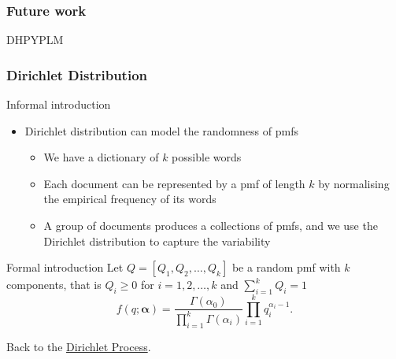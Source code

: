 \begin{frame}
    \frametitle{Future work}

    DHPYPLM
\end{frame}

\appendix
\begin{frame}[label=dirichletsupplemental]
    \frametitle{Dirichlet Distribution}

    \begin{block}{Informal introduction}
        \begin{itemize}
            \item Dirichlet distribution can model the randomness of pmfs
            \begin{itemize}
                \item We have a dictionary of $k$ possible words
                \item Each document can be represented by a pmf of length $k$ by normalising the empirical frequency of its words
                \item A group of documents produces a collections of pmfs, and we use the Dirichlet distribution to capture the variability
            \end{itemize}
        \end{itemize}
    \end{block}

    \begin{block}{Formal introduction}
        Let $Q = [Q_1, Q_2,\ldots,Q_k]$ be a random pmf with $k$ components, that is $Q_i \geq 0$ for $i=1,2,\ldots,k$ and $\sum_{i=1}^k Q_i = 1$
        \[ f(q;\boldsymbol\alpha) = \frac{\Gamma(\alpha_0)}{\prod_{i=1}^k\Gamma(\alpha_i)}\prod_{i=1}^kq_i^{\alpha_i-1}. \]
    \end{block}
Back to the \hyperlink{dirichletprocess}{Dirichlet Process}.
\end{frame}
